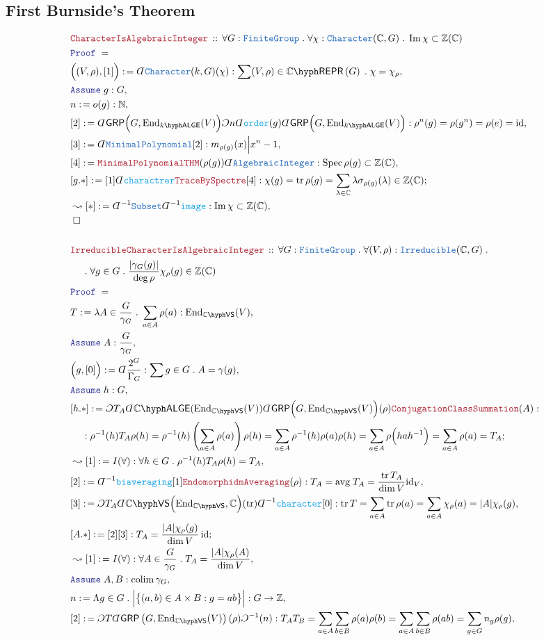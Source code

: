 \documentclass[12pt]{scrartcl}%
\newcommand{\TYPE}[1]{\textcolor{NavyBlue}{\mathtt{#1}}}%
\newcommand{\FUNC}[1]{\textcolor{Cerulean}{\mathtt{#1}}}%
\newcommand{\LOGIC}[1]{\textcolor{Blue}{\mathtt{#1}}}%
\newcommand{\THM}[1]{\textcolor{Maroon}{\mathtt{#1}}}%
\renewcommand{\.}{\; . \;} %
\newcommand{\de}{: \kern 0.1pc =} %
\newcommand{\Theorem}[2]{& \THM{#1} \, :: \, #2 \\ & \Proof = \\ } %
\newcommand{\NewLine}{\\ & \kern 1pc}%
\newcommand{\Page}[1]{ \begin{align*} #1 \end{align*}  }%
\newcommand{ \bd }{ \ByDef }%
\newcommand{\Int}{\mathbb{Z}}%
\newcommand{\Complex}{\mathbb{C}}%
\newcommand{\Nat}{\mathbb{N}}%
\DeclareMathOperator*{\id}{id}%
\DeclareMathOperator*{\im}{Im}%
\newcommand{\End}{\mathrm{End}}%
\newcommand{\Say}[3]{& #1 \de #2 : #3, \\} %
\newcommand{\Conclude}[3]{& #1 \de #2 : #3; \\}%
\newcommand{\Derive}[3]{& \leadsto #1 \de #2 : #3, \\} %
\newcommand{\Assume}[2]{& \LOGIC{Assume} \; #1 : #2, \\} %
\newcommand{\QED}{\; \square} %
\newcommand{\EndProof}{& \QED \\} %
\newcommand{\ByDef}{\rotatebox[origin=c]{-180}{$D$}}%
\newcommand{\ByConstr}{\rotatebox[origin=c]{-180}{$C$}}%
\newcommand{\Proof}{\LOGIC{Proof} \; } %
\DeclareMathOperator*{\colim}{colim}%
\newcommand{\FG}{\TYPE{FiniteGroup}} %
\newcommand{\GRP}{\mathsf{GRP}} %
\newcommand{\REPR}[2]{#1\hyph\mathsf{REPR}\left(#2\right)}
\DeclareMathOperator{\tr}{tr}     %
\DeclareMathOperator{\Spec}{Spec} %
\newcommand{\VS}[1]{#1\hyph\mathsf{VS}} %
\newcommand{\LALGE}[1]{#1\hyph\mathsf{ALGE}}%
\begin{document}
\subsection{First Burnside's Theorem}
\Page{
	\Theorem{CharacterIsAlgebraicInteger}
	{
		\forall  G : \FG \.
		\forall  \chi : \TYPE{Character}(\Complex, G) \.
		\im \chi \subset \Int(\Complex)
	}
	\Say{\Big( (V,\rho), [1] \Big)}{\bd \TYPE{Character}(k,G)(\chi)}
	{
		\sum (V,\rho) \in \REPR{\Complex}{G} \. \chi = \chi_{\rho}                          
	}
	\Assume{g}{ G  }
	\Say{n}{o(g)}{\Nat}
	\Say{[2]}{  
		\bd \GRP\Big( G, \End_{\LALGE{k}}(V) \Big)  
		\ByConstr n
		\bd \FUNC{order}(g)
		\bd \GRP\Big( G, \End_{\LALGE{k}}(V) \Big)  
	}
	{ 
		\rho^n(g) = 
		\rho(g^n) = 
		\rho(e) 
		= \id 
	}
	\Say{[3]}{
		\bd \TYPE{MinimalPolynomial} [2] 
	}
	{
		m_{\rho(g)}(x) \Big| x^n - 1
	}
	\Say{[4]}{\THM{MinimalPolynomialTHM}(\rho(g))\bd \TYPE{AlgebraicInteger}}
	{  \Spec \rho(g) \subset \Int(\Complex) }
	\Conclude{[g.*]}{ [1]\bd \FUNC{charactrer} \THM{TraceBySpectre}[4]  }
	{	
		\chi(g) = 
		\tr \rho(g) =  
		\sum_{\lambda \in \Complex} \lambda \sigma_{\rho(g)}(\lambda) \in \Int(\Complex)
	}
	\Derive{[*]}{\bd^{-1} \TYPE{Subset} \bd^{-1} \FUNC{image}}
	{
		\im \chi \subset \Int(\Complex)
	}
	\EndProof
	\\
	\Theorem{IrreducibleCharacterIsAlgebraicInteger}
	{
		\forall  G : \FG \.
		\forall  (V,\rho) : \TYPE{Irreducible}(\Complex, G) \. 
		\NewLine \. 
		\forall  g \in G \. 
		\frac{|\gamma_G(g)|}{\deg \rho} \chi_\rho(g) \in \Int(\Complex)
	}
	\Say{T}{\lambda A \in \frac{G}{\gamma_G} \. \sum_{a \in A} \rho(a) }{\End_{\VS{\Complex}}(V)}
	\Assume{A}{ \frac{G}{\gamma_G} }	
	\Say{\Big(g,[0]\Big)}{\bd \frac{2^G}{\Gamma_G}}{\sum g \in G \. A = \gamma(g) } 
	\Assume{h}{G}
	\Conclude{[h.*]}{
		\ByConstr T_A
		\bd \LALGE{\Complex}(\End_{\VS{\Complex}}(V))
		\bd \GRP\Big(G,\End_{\VS{\Complex}}(V)\Big)(\rho)
		\THM{ConjugationClassSummation}(A)                                                             
	}
	{
		\NewLine:
		\rho^{-1}(h) T_A \rho(h) =
		\rho^{-1}(h)\left( \sum_{a \in A} \rho(a)  \right)\rho(h) =
		\sum_{a \in A}  \rho^{-1}(h)\rho(a) \rho(h) = 
		\sum_{a \in A}  \rho\Big(hah^{-1}\Big) =
		\sum_{a \in A}  \rho(a) = 
		T_A
	}
	\Derive{[1]}
	{
		I(\forall)
	}
	{
		\forall h \in G \. 
		\rho^{-1}(h) T_A \rho(h) = T_A
	}
	\Say{[2]}{\bd^{-1} \FUNC{biaveraging}[1]\THM{EndomorphidmAveraging}(\rho)}
	{ T_A = \mathrm{avg} \; T_A = \frac{\tr T_A}{\dim V} {\id}_V }
	\Say{[3]}{ 
		\ByConstr T_A \bd \VS{\Complex}\Big(\End_{\VS{\Complex}},\Complex\Big)(\tr)
		\bd^{-1} \FUNC{character}
		[0]
	}
	{
		\tr T = 
		\sum_{a \in A} \tr \rho(a) =
		\sum_{a \in A} \chi_\rho(a) =
		|A| \chi_\rho(g) 
	}
	\Conclude{[A.*]}{[2][3]}{T_A= \frac{|A|\chi_\rho(g)}{\dim V} \id}
	\Derive{[1]}{I(\forall)}{\forall A \in \frac{G}{\gamma_G} \. T_A = \frac{|A|\chi_\rho(A)}{\dim V}}
	\Assume{A,B}{\colim \gamma_G}
	\Say{n}{\Lambda g \in G \. \Big|\big\{  (a,b) \in A \times B : g = ab \big\} \Big|}
	{
		G \to \Int
	}
	\Say{[2]}{ \ByConstr T \bd \GRP\left(G, \End_{\VS{\Complex}}(V) \right)(\rho)\ByConstr^{-1}(n)}
	{
		T_AT_B = 
		\sum_{a \in A} \sum_{b \in B} \rho(a)\rho(b) =
		\sum_{a \in A} \sum_{b \in B} \rho(ab) =
		\sum_{g \in G} n_g \rho(g)
	}
}
\end{document}

